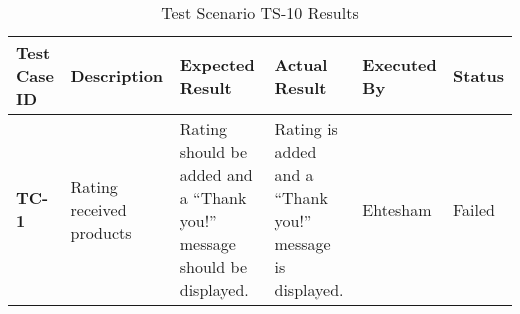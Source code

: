 \begin{table}[H]
    \centering
   \begin{tabular}{ | m{1cm} | m{2.5cm}| m{2.7cm} | m{2.7cm} | m{1.7cm} | m{1.3cm} |}  
  \hline  \textbf{Test Case ID} &  \textbf{Description} &  \textbf{Expected Result} &  \textbf{Actual Result} &  \textbf{Executed By} &  \textbf{Status}  \\  \hline
  \textbf{TC-1} & Rating received products & Rating should be added and a “Thank you!” message should be displayed. & Rating is added and a “Thank you!” message is displayed. & Ehtesham & Failed
  \\  \hline
  
\end{tabular}
    \caption{Test Scenario TS-10 Results}
    \label{tab: Test Scenario TS-10 Results}
\end{table}

\justifying
